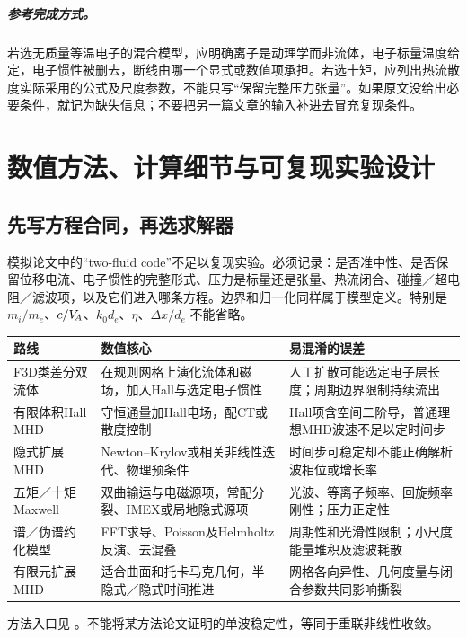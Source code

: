 \documentclass[UTF8,a4paper,11pt,openany,fontset=fandol]{ctexbook}
\begin{document}
\paragraph{参考完成方式。}
若选无质量等温电子的混合模型，应明确离子是动理学而非流体，电子标量温度给定，电子惯性被删去，断线由哪一个显式或数值项承担。若选十矩，应列出热流散度实际采用的公式及尺度参数，不能只写“保留完整压力张量”。如果原文没给出必要条件，就记为缺失信息；不要把另一篇文章的输入补进去冒充复现条件。



\chapter{数值方法、计算细节与可复现实验设计}\label{ch:numerics}
\section{先写方程合同，再选求解器}
模拟论文中的“two-fluid code”不足以复现实验。必须记录：是否准中性、是否保留位移电流、电子惯性的完整形式、压力是标量还是张量、热流闭合、碰撞／超电阻／滤波项，以及它们进入哪条方程。边界和归一化同样属于模型定义。特别是 $m_i/m_e$、$c/V_{\!A}$、$k_0d_e$、$\eta$、$\Delta x/d_e$ 不能省略。

\begin{longtable}{P{30mm}P{54mm}P{64mm}}
\toprule 路线 & 数值核心 & 易混淆的误差\\\midrule
F3D类差分双流体 & 在规则网格上演化流体和磁场，加入Hall与选定电子惯性 & 人工扩散可能选定电子层长度；周期边界限制持续流出\\
有限体积Hall MHD & 守恒通量加Hall电场，配CT或散度控制 & Hall项含空间二阶导，普通理想MHD波速不足以定时间步\\
隐式扩展MHD & Newton--Krylov或相关非线性迭代、物理预条件 & 时间步可稳定却不能正确解析波相位或增长率\\
五矩／十矩Maxwell & 双曲输运与电磁源项，常配分裂、IMEX或局地隐式源项 & 光波、等离子频率、回旋频率刚性；压力正定性\\
谱／伪谱约化模型 & FFT求导、Poisson及Helmholtz反演、去混叠 & 周期性和光滑性限制；小尺度能量堆积及滤波耗散\\
有限元扩展MHD & 适合曲面和托卡马克几何，半隐式／隐式时间推进 & 网格各向异性、几何度量与闭合参数共同影响撕裂\\\bottomrule
\end{longtable}
方法入口见 \citet{Cassak2008,Toth2008,Arnold2008,Hakim2008,Wang2015}。不能将某方法论文证明的单波稳定性，等同于重联非线性收敛。
\end{document}
